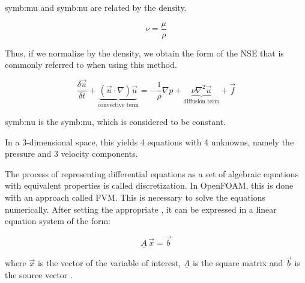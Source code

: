 \glsdesc{symb:mu} and \glsdesc{symb:nu} are related by the density.

\begin{equation}
\nu= \frac{\mu}{\rho}
\end{equation}

Thus, if we normalize  by the density, we obtain the form of the \gls{NSE} that is commonly referred to when using this method.

\begin{equation}
\frac{\delta \vec{u}}{\delta t}+\underbrace{(\vec{u}\cdot\nabla)\vec{u}}_{\text{convective term}} =-\frac{1}{\rho}\nabla p + \underbrace{\nu \nabla^2 \vec{u}}_{\text{diffusion term}}+\vec{f}
\end{equation}


\gls{symb:nu} is the \glsdesc{symb:nu}, which is considered to be constant. 

In a 3-dimensional space, this yields \num{4} equations with \num{4} unknowns, namely the pressure and \num{3} velocity components.


The process of representing differential equations as a set of algebraic equations with equivalent properties is called discretization. In OpenFOAM, this is done with an approach called \gls{FVM}. This is necessary to solve the equations numerically.
After setting the appropriate \BC, it can be expressed in a linear equation system of the form:


\begin{equation}
\underline{A}\, \vec{x} = \vec{b}
\end{equation}

where $\vec{x}$ is the vector of the variable of interest, $\underline{A}$ is the square matrix and $\vec{b}$ is the source vector \citep{Sert2012}.

%
%
